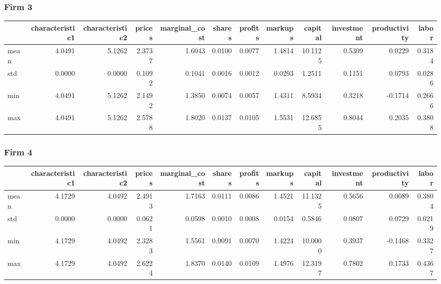  \subsubsection*{Firm 3}
\begin{tabular}{lrrrrrrrrrrr}
\toprule
{} &  characteristic1 &  characteristic2 &  prices &  marginal\_cost &  shares &  profits &  markups &  capital &  investment &  productivity &  labor \\
\midrule
mean &           4.0491 &           5.1262 &  2.3737 &         1.6043 &  0.0100 &   0.0077 &   1.4814 &  10.1125 &      0.5309 &        0.0229 & 0.3184 \\
std  &           0.0000 &           0.0000 &  0.1092 &         0.1041 &  0.0016 &   0.0012 &   0.0293 &   1.2511 &      0.1151 &        0.0793 & 0.0286 \\
min  &           4.0491 &           5.1262 &  2.1492 &         1.3850 &  0.0074 &   0.0057 &   1.4311 &   8.5934 &      0.3218 &       -0.1714 & 0.2666 \\
max  &           4.0491 &           5.1262 &  2.5788 &         1.8020 &  0.0137 &   0.0105 &   1.5531 &  12.6855 &      0.8044 &        0.2035 & 0.3808 \\
\bottomrule
\end{tabular}


 \subsubsection*{Firm 4}
\begin{tabular}{lrrrrrrrrrrr}
\toprule
{} &  characteristic1 &  characteristic2 &  prices &  marginal\_cost &  shares &  profits &  markups &  capital &  investment &  productivity &  labor \\
\midrule
mean &           4.1729 &           4.0492 &  2.4913 &         1.7163 &  0.0111 &   0.0086 &   1.4521 &  11.1325 &      0.5656 &        0.0089 & 0.3804 \\
std  &           0.0000 &           0.0000 &  0.0621 &         0.0598 &  0.0010 &   0.0008 &   0.0154 &   0.5846 &      0.0807 &        0.0729 & 0.0219 \\
min  &           4.1729 &           4.0492 &  2.3283 &         1.5561 &  0.0091 &   0.0070 &   1.4224 &  10.0000 &      0.3937 &       -0.1468 & 0.3327 \\
max  &           4.1729 &           4.0492 &  2.6224 &         1.8370 &  0.0140 &   0.0109 &   1.4976 &  12.3197 &      0.7802 &        0.1733 & 0.4367 \\
\bottomrule
\end{tabular}


